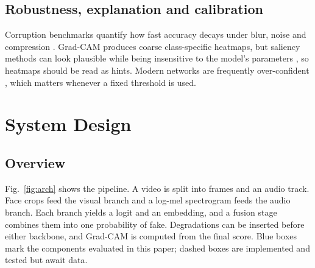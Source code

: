 \documentclass[conference]{IEEEtran}
\begin{document}
\subsection{Robustness, explanation and calibration}
Corruption benchmarks quantify how fast accuracy decays under blur, noise and compression \cite{hendrycks2019corruptions}. Grad-CAM \cite{selvaraju2017gradcam} produces coarse class-specific heatmaps, but saliency methods can look plausible while being insensitive to the model's parameters \cite{adebayo2018sanity}, so heatmaps should be read as hints. Modern networks are frequently over-confident \cite{guo2017calibration}, which matters whenever a fixed threshold is used.

\section{System Design}
\subsection{Overview}
Fig.~\ref{fig:arch} shows the pipeline. A video is split into frames and an audio track. Face crops feed the visual branch and a log-mel spectrogram feeds the audio branch. Each branch yields a logit and an embedding, and a fusion stage combines them into one probability of fake. Degradations can be inserted before either backbone, and Grad-CAM is computed from the final score. Blue boxes mark the components evaluated in this paper; dashed boxes are implemented and tested but await data.
\end{document}
